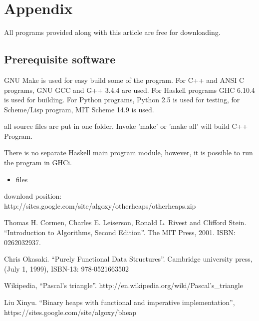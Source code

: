 \documentclass{article}
\begin{document}
\section{Appendix} \label{appendix}
All programs provided along with this article are free for
downloading.

\subsection{Prerequisite software}
GNU Make is used for easy build some of the program. For C++ and ANSI C programs,
GNU GCC and G++ 3.4.4 are used. 
For Haskell programs GHC 6.10.4 is used
for building. For Python programs, Python 2.5 is used for testing, for
Scheme/Lisp program, MIT Scheme 14.9 is used.

all source files are put in one folder. Invoke 'make' or 'make all'
will build C++ Program. 

There is no separate Haskell main program module, however, it is possible to run the program in GHCi.

\begin{itemize}
\item files

\end{itemize}

download position: http://sites.google.com/site/algoxy/otherheaps/otherheaps.zip

\begin{thebibliography}{99}

Thomas H. Cormen, Charles E. Leiserson, Ronald L. Rivest and Clifford Stein. ``Introduction to Algorithms, Second Edition''. The MIT Press, 2001. ISBN: 0262032937.

Chris Okasaki. ``Purely Functional Data Structures''. Cambridge university press, (July 1, 1999), ISBN-13: 978-0521663502

Wikipedia, ``Pascal's triangle''. http://en.wikipedia.org/wiki/Pascal's\_triangle

Liu Xinyu. ``Binary heaps with functional and imperative implementation'', https://sites.google.com/site/algoxy/bheap

\end{thebibliography}

\ifx\wholebook\relax \else
\end{document}
